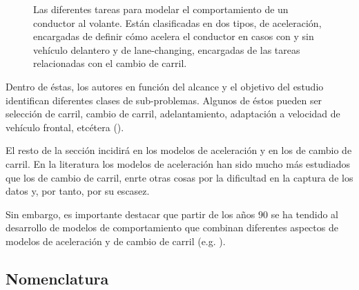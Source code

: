 \begin{figure}
	\centering
	\caption{Las diferentes tareas para modelar el comportamiento de un conductor al volante. Están clasificadas en dos tipos, de aceleración, encargadas de definir cómo acelera el conductor en casos con y sin vehículo delantero y de lane-changing, encargadas de las tareas relacionadas con el cambio de carril.}
	\label{fig:behavior-model-classification}
\end{figure}

Dentro de éstas, los autores en función del alcance y el objetivo del estudio identifican diferentes clases de sub-problemas. Algunos de éstos pueden ser selección de carril, cambio de carril, adelantamiento, adaptación a velocidad de vehículo frontal, etcétera (\cite{Aycin1999}).

El resto de la sección incidirá en los modelos de aceleración y en los de cambio de carril. En la literatura los modelos de aceleración han sido mucho más estudiados que los de cambio de carril, enrte otras cosas por la dificultad en la captura de los datos y, por tanto, por su escasez.

Sin embargo, es importante destacar que partir de los años $90$ se ha tendido al desarrollo de modelos de comportamiento que combinan diferentes aspectos de modelos de aceleración y de cambio de carril (e.g. \cite{Ma2004}).

\subsection{Nomenclatura}

